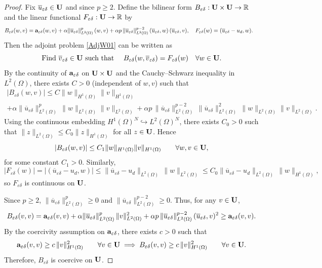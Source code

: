 \documentclass[11pt,a4paper]{article}
\numberwithin{equation}{section}
\def\wo{\overline}
\def\O{\Omega}
\def\a{{\alpha}}
\def\Ga{{\bf a}}
\def\R{{\mathbb{R}}}
\def\R{{\mathbb{R}}}
\def\ed{{\varepsilon\delta}}
\def\Ga{{\bf a}}
\def\GU{{\bf U}}
\begin{document}
	\begin{proof}
		Fix $\wo u_\ed\in \GU$ and since $p\ge 2$. 
		Define the bilinear form $B_\ed:\GU\times\GU\to\R$ and the linear functional $F_\ed:\GU\to\R$ by
		\begin{align*}
			B_\ed(w,v)
			&=\Ga_\ed(w,v)
			+\a\|\wo u_\ed\|_{L^2(\O)}^{p}\,(w,v)
			+\a p\,\|\wo u_\ed\|_{L^2(\O)}^{p-2}\,(\wo u_\ed,w)\,(\wo u_\ed,v),\quad
			F_\ed(w)
			=(\wo u_\ed-u_d,w).
		\end{align*}
		Then the adjoint problem \eqref{AdjW01} can be written as
		\begin{equation}\label{AdjW01_LM}
			\text{Find $\wo v_\ed\in\GU$ such that } \quad B_\ed(w,\wo v_\ed)=F_\ed(w)\quad\forall w\in\GU.
		\end{equation}
		By the continuity of $\Ga_\ed$ on $\GU\times\GU$ and the Cauchy--Schwarz inequality in $L^2(\O)$,
		there exists $C>0$ (independent of $w,v$) such that
		\begin{multline*}
			|B_\ed(w,v)|
			\le C\|w\|_{H^1(\O)}\|v\|_{H^1(\O)}\\
			+\a\|\wo u_\ed\|_{L^2(\O)}^{p}\,\|w\|_{L^2(\O)}\|v\|_{L^2(\O)}
			+\a p\,\|\wo u_\ed\|_{L^2(\O)}^{p-2}\,\|\wo u_\ed\|_{L^2(\O)}^2\,\|w\|_{L^2(\O)}\|v\|_{L^2(\O)}.
		\end{multline*}
		Using the continuous embedding $H^1(\O)^N\hookrightarrow L^2(\O)^N$, there exists $C_0>0$
		such that $\|z\|_{L^2(\O)}\le C_0\|z\|_{H^1(\O)}$ for all $z\in\GU$. Hence
		\[
		|B_\ed(w,v)|\le C_1\|w\|_{H^1(\O)}\|v\|_{H^1(\O)}\qquad\forall w,v\in\GU,
		\]
		for some constant $C_1>0$. Similarly,
		\[
		|F_\ed(w)|=|(\wo u_\ed-u_d,w)|\le \|\wo u_\ed-u_d\|_{L^2(\O)}\,\|w\|_{L^2(\O)}
		\le C_0\|\wo u_\ed-u_d\|_{L^2(\O)}\,\|w\|_{H^1(\O)},
		\]
		so $F_\ed$ is continuous on $\GU$.

		Since $p\ge 2$, $\|\wo u_\ed\|_{L^2(\O)}^{p}\ge 0$ and $\|\wo u_\ed\|_{L^2(\O)}^{p-2}\ge 0$. Thus,
		for any $v\in\GU$,
		\[
		B_\ed(v,v)
		=\Ga_\ed(v,v)+\a\|\wo u_\ed\|_{L^2(\O)}^{p}\,\|v\|_{L^2(\O)}^{2}
		+\a p\,\|\wo u_\ed\|_{L^2(\O)}^{p-2}\,(\wo u_\ed,v)^2
		\ge \Ga_\ed(v,v).
		\]
		By the coercivity assumption on $\Ga_\ed$, there exists $c>0$ such that
		\[
		\Ga_\ed(v,v)\ge c\,\|v\|_{H^1(\O)}^2\qquad\forall v\in\GU\implies B_\ed(v,v)\ge c\,\|v\|_{H^1(\O)}^2\qquad\forall v\in\GU.
		\]
		Therefore, $B_\ed$ is coercive on $\GU$.


\end{proof}
\end{document}
